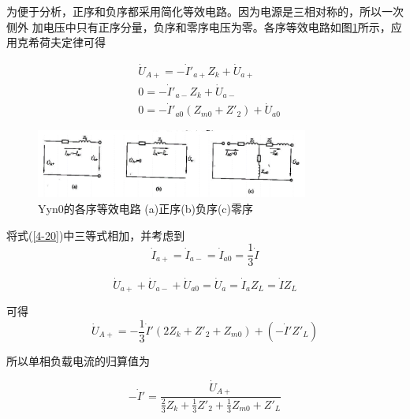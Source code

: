 \documentclass{book}
\begin{document}
为便于分析，正序和负序都采用简化等效电路。因为电源是三相对称的，所以一次侧外 加电压中只有正序分量，负序和零序电压为零。各序等效电路如图\ref{fig_4.22}所示，应用克希荷夫定律可得

\begin{align}
& {{{\dot{U}}}_{A+}}=-{{{{\dot{I}}'}}_{a+}}{{Z}_{k}}+{{{\dot{U}}}_{a+}} \\ 
& 0=-{{{{\dot{I}}'}}_{a-}}{{Z}_{k}}+{{{\dot{U}}}_{a-}} \\ 
& 0=-{{{{\dot{I}}'}}_{a0}}\left( {{Z}_{m0}}+{{{{Z}'}}_{2}} \right)+{{{\dot{U}}}_{a0}} 
\label{4-20}
\end{align} 

\begin{figure}[H]
	\centering
	\includegraphics[width=0.80\textwidth]{4-22.png}
	\caption{Yyn0的各序等效电路
		(a)正序(b)负序(c)零序}
	\label{fig_4.22}
\end{figure}

将式(\ref{4-20})中三等式相加，并考虑到
\begin{equation}
{{\dot{I}}_{a+}}={{\dot{I}}_{a-}}={{\dot{I}}_{a0}}=\frac{1}{3}\dot{I}
\label{4-21}
\end{equation}

\begin{equation}
{{\dot{U}}_{a+}}+{{\dot{U}}_{a-}}+{{\dot{U}}_{a0}}={{\dot{U}}_{a}}={{\dot{I}}_{a}}{{Z}_{L}}=\dot{I}{{Z}_{L}}
\label{4-22}
\end{equation}

可得	
\begin{equation}
{{\dot{U}}_{A+}}=-\frac{1}{3}{\dot{I}}'\left( 2{{Z}_{k}}+{{{{Z}'}}_{2}}+{{Z}_{m0}} \right)+\left( -{\dot{I}}'{{{{Z}'}}_{L}} \right)
\label{4-23}
\end{equation}

所以单相负载电流的归算值为

\begin{equation}
-{\dot{I}}'=\frac{{{{\dot{U}}}_{A+}}}{\frac{2}{3}{{Z}_{k}}+\frac{1}{3}{{{{Z}'}}_{2}}+\frac{1}{3}{{Z}_{m0}}+{{{{Z}'}}_{L}}}
\label{4-24}
\end{equation}
\end{document}
